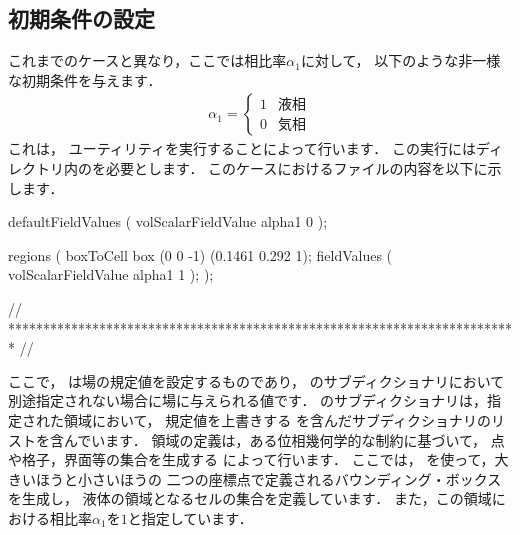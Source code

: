 \subsection{初期条件の設定}
\label{ssec:2.3.3}
これまでのケースと異なり，ここでは相比率$\alpha_{1}$に対して，
以下のような非一様な初期条件を与えます．
\begin{align}
 \label{eq:2.15}
 \alpha_{1} =
 \begin{cases}
  1 & \text{液相} \\
  0 & \text{気相}
 \end{cases}
\end{align}
これは，
%
%
ユーティリティを実行することによって行います．
この実行にはディレクトリ内のを必要とします．
このケースにおけるファイルの内容を以下に示します．
\begin{OFverbatim}[file, linenum=17]

defaultFieldValues
(
    volScalarFieldValue alpha1 0
);

regions
(
    boxToCell
    {
        box (0 0 -1) (0.1461 0.292 1);
        fieldValues
        (
            volScalarFieldValue alpha1 1
        );
    }
);


// ************************************************************************* //
\end{OFverbatim}
ここで，
%
%
は場の規定値を設定するものであり，
%
%
のサブディクショナリにおいて別途指定されない場合に場に与えられる値です．
のサブディクショナリは，指定された領域において，
規定値を上書きする
%
%
を含んだサブディクショナリのリストを含んでいます．
領域の定義は，ある位相幾何学的な制約に基づいて，
点や格子，界面等の集合を生成する
%
%
によって行います．
ここでは，
%
%
を使って，大きいほうと小さいほうの
二つの座標点で定義されるバウンディング・ボックスを生成し，
液体の領域となるセルの集合を定義しています．
また，この領域における相比率$\alpha_{1}$を$1$と指定しています．

